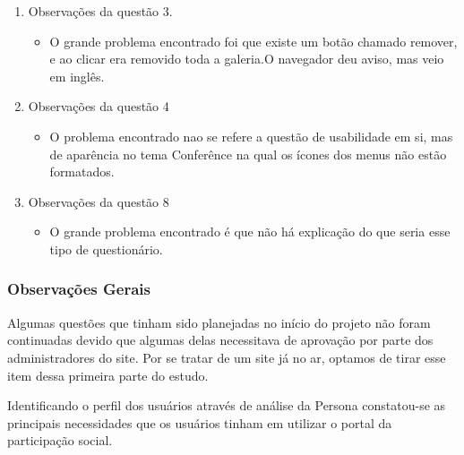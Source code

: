 \begin{enumerate}
		\item Observações da questão 3.
		\begin{itemize}
			\item O grande problema encontrado foi que existe um botão chamado remover, e ao clicar era removido toda a galeria.O navegador deu aviso, mas veio em inglês.
		\end{itemize}
		
		\item Observações da questão 4
		\begin{itemize}
			\item O problema encontrado nao se refere a questão de usabilidade em si, mas de aparência no tema Conferênce na qual os ícones dos menus não estão formatados.
		\end{itemize}
		
		\item Observações da questão 8
		\begin{itemize}
		\item O grande problema encontrado é que não há explicação do que seria esse tipo de questionário.
		\end{itemize}

	\end{enumerate}
	
	\subsubsection{Observações Gerais}

	Algumas questões que tinham sido planejadas no início do projeto não foram continuadas devido que algumas delas necessitava de aprovação por parte dos administradores do site. Por se tratar de um site já no ar, optamos de tirar esse item dessa primeira parte do estudo.

	Identificando o perfil dos usuários através de análise da Persona constatou-se as principais necessidades que os usuários tinham em utilizar o portal da participação social.



